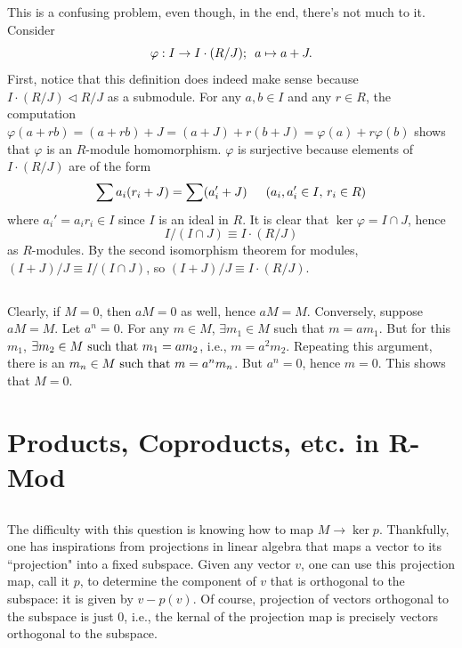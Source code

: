 \documentclass[12pt]{article}
\begin{document}
\setcounter{subsection}{14}
\subsection{} 
This is a confusing problem, even though, in the end, there's not much to it. 
Consider 
$$\varphi: I \rightarrow I \cdot (R / J); \hspace{0.5em} a \mapsto a + J.$$
First, notice that this definition does indeed make sense because $I \cdot (R / J) \lhd R / J$ as a submodule. 
For any $a, b \in I$ and any $r \in R$, the computation $\varphi(a + rb) = (a + rb) + J = (a + J) + r(b + J) = \varphi(a) + r\varphi(b)$ shows that $\varphi$ is an $R$-module homomorphism.
$\varphi$ is surjective because elements of $I \cdot (R / J)$ are of the form 
$$\sum a_i (r_i + J) = \sum (a_i' + J) \hspace{1.5em} (a_i, a_i' \in I, \, r_i \in R)$$
where $a_i' = a_i r_i \in I$ since $I$ is an ideal in $R$. 
It is clear that $\ker \varphi = I \cap J$, hence 
$$I / (I \cap J) \equiv I \cdot (R / J)$$ 
as $R$-modules. 
By the second isomorphism theorem for modules, $(I + J) / J \equiv I / (I \cap J)$, so $(I + J) / J \equiv I \cdot (R / J)$.  

\subsection{} 
Clearly, if $M = 0$, then $aM = 0$ as well, hence $aM = M$. 
Conversely, suppose $aM = M$. 
Let $a^n = 0$. 
For any $m \in M$, $\exists m_1 \in M$ such that $m = am_1$. 
But for this $m_1$, $\exists m_2 \in M \text{ such that } m_1 = am_2$, i.e., $m = a^2 m_2$. 
Repeating this argument, there is an $m_n \in M \text{ such that } m = a^n m_n$. 
But $a^n = 0$, hence $m = 0$. 
This shows that $M = 0$. 

\section{Products, Coproducts, etc. in R-Mod}
\setcounter{subsection}{2} 
\subsection{} 
The difficulty with this question is knowing how to map $M \rightarrow \ker p$. 
Thankfully, one has inspirations from projections in linear algebra that maps a vector to its ``projection" into a fixed subspace.  
Given any vector $v$, one can use this projection map, call it $p$, to determine the component of $v$ that is orthogonal to the subspace: 
it is given by $v - p(v)$. 
Of course, projection of vectors orthogonal to the subspace is just 0, i.e., the kernal of the projection map is precisely vectors orthogonal to the subspace.  
\end{document}
